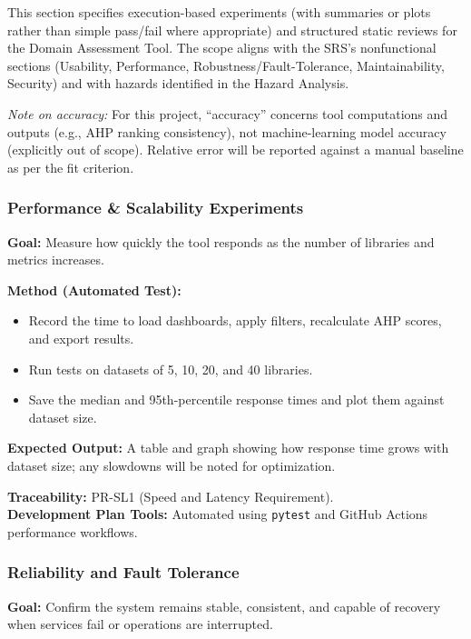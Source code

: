 \documentclass[12pt, titlepage]{article}
\begin{document}
This section specifies execution-based experiments (with summaries or plots rather than simple pass/fail where appropriate) and structured static reviews for the Domain Assessment Tool. The scope aligns with the SRS’s nonfunctional sections (Usability, Performance, Robustness/Fault-Tolerance, Maintainability, Security) and with hazards identified in the Hazard Analysis.

\textit{Note on accuracy:} For this project, ``accuracy'' concerns tool computations and outputs (e.g., AHP ranking consistency), not machine-learning model accuracy (explicitly out of scope). Relative error will be reported against a manual baseline as per the fit criterion.

\subsubsection{Performance \& Scalability Experiments}
\label{subsubsec:performance}

\textbf{Goal:} Measure how quickly the tool responds as the number of libraries and metrics increases.

\textbf{Method (Automated Test):}
\begin{itemize}
  \item Record the time to load dashboards, apply filters, recalculate AHP scores, and export results.
  \item Run tests on datasets of 5, 10, 20, and 40 libraries.
  \item Save the median and 95th-percentile response times and plot them against dataset size.
\end{itemize}

\textbf{Expected Output:} A table and graph showing how response time grows with dataset size; any slowdowns will be noted for optimization.

\textbf{Traceability:} PR-SL1 (Speed and Latency Requirement).\\
\textbf{Development Plan Tools:} Automated using \texttt{pytest} and GitHub Actions performance workflows.

\subsubsection{Reliability and Fault Tolerance}
\label{subsubsec:reliability}

\textbf{Goal:} Confirm the system remains stable, consistent, and capable of recovery when services fail or operations are interrupted.
\end{document}
